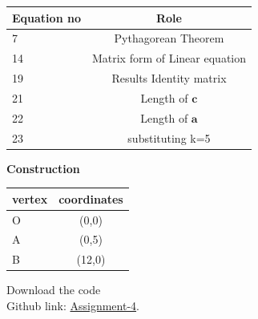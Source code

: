 \documentclass[10pt,a4paper]{report}
\begin{document}
\begin{multicols}{2}
\begin{center}
\begin{tabular}{|l|c|}
    \hline 
    \textbf{Equation no} & \textbf{Role} \\ \hline
    7 &  Pythagorean Theorem \\ 
    14 & Matrix form of Linear equation  \\
    19 & Results Identity matrix  \\
    21 & Length of $\boldsymbol{c}$\\
    22 & Length of $\boldsymbol{a}$\\
    23 & substituting k=5\\
    \hline
      \end{tabular}
  \end{center} \vspace{2mm}
  
 \vspace{2mm} \textbf{Construction}
\begin{center}
\setlength{\arrayrulewidth}{0.5mm}
\setlength{\tabcolsep}{5pt}
\renewcommand{\arraystretch}{3}
    \begin{tabular}{|l|c|}
    \hline 
    \textbf{vertex} & \textbf{coordinates} \\ \hline
    O & (0,0)  \\ 
    A & (0,5)  \\
    B & (12,0) \\
    \hline
      \end{tabular}
  \end{center}
  
\raggedright  Download the code \\
Github link: \href{https://github.com/chiragshah1244/FWC/blob/main/assignments/assignment_4/code/triangle.py}{Assignment-4}.
  \end{multicols}
\end{document}

